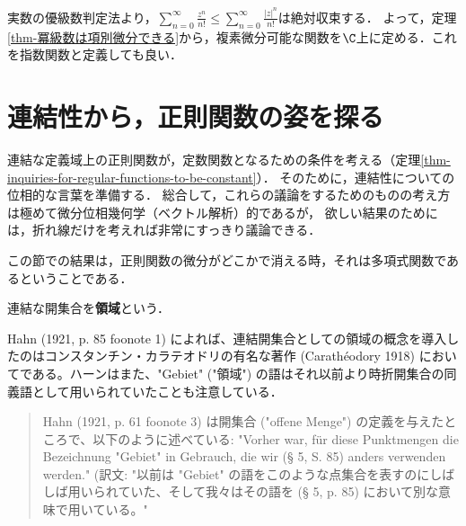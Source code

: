 \documentclass[uplatex, dvipdfmx]{jsreport}
\begin{document}
\begin{remark}[別定義]
    実数の優級数判定法より，$\sum^\infty_{n=0}\frac{z^n}{n!}\le\sum^\infty_{n=0}\frac{|z|^n}{n!}$は絶対収束する．
    よって，定理\ref{thm-冪級数は項別微分できる}から，複素微分可能な関数を$\C$上に定める．これを指数関数と定義しても良い．
\end{remark}

\section{連結性から，正則関数の姿を探る}

\begin{screen}
    連結な定義域上の正則関数が，定数関数となるための条件を考える（定理\ref{thm-inquiries-for-regular-functions-to-be-constant}）．
    そのために，連結性についての位相的な言葉を準備する．
    総合して，これらの議論をするためのものの考え方は極めて微分位相幾何学（ベクトル解析）的であるが，
    欲しい結果のためには，折れ線だけを考えれば非常にすっきり議論できる．

    この節での結果は，正則関数の微分がどこかで消える時，それは多項式関数であるということである．
\end{screen}

\begin{definition}
    連結な開集合を\textbf{領域}という．
\end{definition}
\begin{remark}
    Hahn (1921, p. 85 foonote 1) によれば、連結開集合としての領域の概念を導入したのはコンスタンチン・カラテオドリの有名な著作 (Carathéodory 1918) においてである。ハーンはまた、"Gebiet" ("領域") の語はそれ以前より時折開集合の同義語として用いられていたことも注意している．
    \begin{quote}
        Hahn (1921, p. 61 foonote 3) は開集合 ("offene Menge") の定義を与えたところで、以下のように述べている: "Vorher war, für diese Punktmengen die Bezeichnung "Gebiet" in Gebrauch, die wir (§ 5, S. 85) anders verwenden werden." (訳文: "以前は "Gebiet" の語をこのような点集合を表すのにしばしば用いられていた、そして我々はその語を (§ 5, p. 85) において別な意味で用いている。"
    \end{quote}
\end{remark}
\end{document}
